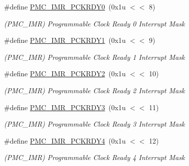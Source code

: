 \begin{DoxyCompactItemize}
\mbox{\label{group__SAME70__PMC_ga31f003d970a773e7eb1649c26aed0a68}} 
\#define \mbox{\hyperlink{group__SAME70__PMC_ga31f003d970a773e7eb1649c26aed0a68}{P\+M\+C\+\_\+\+I\+M\+R\+\_\+\+P\+C\+K\+R\+D\+Y0}}~(0x1u $<$$<$ 8)
\begin{DoxyCompactList}\small\item\em (P\+M\+C\+\_\+\+I\+MR) Programmable Clock Ready 0 Interrupt Mask \end{DoxyCompactList}\item 
\mbox{\label{group__SAME70__PMC_gac34959a795514620271d158871cf835d}} 
\#define \mbox{\hyperlink{group__SAME70__PMC_gac34959a795514620271d158871cf835d}{P\+M\+C\+\_\+\+I\+M\+R\+\_\+\+P\+C\+K\+R\+D\+Y1}}~(0x1u $<$$<$ 9)
\begin{DoxyCompactList}\small\item\em (P\+M\+C\+\_\+\+I\+MR) Programmable Clock Ready 1 Interrupt Mask \end{DoxyCompactList}\item 
\mbox{\label{group__SAME70__PMC_ga900f4f1c6b07e3713ce4a4935eea5fee}} 
\#define \mbox{\hyperlink{group__SAME70__PMC_ga900f4f1c6b07e3713ce4a4935eea5fee}{P\+M\+C\+\_\+\+I\+M\+R\+\_\+\+P\+C\+K\+R\+D\+Y2}}~(0x1u $<$$<$ 10)
\begin{DoxyCompactList}\small\item\em (P\+M\+C\+\_\+\+I\+MR) Programmable Clock Ready 2 Interrupt Mask \end{DoxyCompactList}\item 
\mbox{\label{group__SAME70__PMC_gaaeeb62343adc85408c5d94b90934b297}} 
\#define \mbox{\hyperlink{group__SAME70__PMC_gaaeeb62343adc85408c5d94b90934b297}{P\+M\+C\+\_\+\+I\+M\+R\+\_\+\+P\+C\+K\+R\+D\+Y3}}~(0x1u $<$$<$ 11)
\begin{DoxyCompactList}\small\item\em (P\+M\+C\+\_\+\+I\+MR) Programmable Clock Ready 3 Interrupt Mask \end{DoxyCompactList}\item 
\mbox{\label{group__SAME70__PMC_ga0223426b2d009e27a00a9da99dfa5670}} 
\#define \mbox{\hyperlink{group__SAME70__PMC_ga0223426b2d009e27a00a9da99dfa5670}{P\+M\+C\+\_\+\+I\+M\+R\+\_\+\+P\+C\+K\+R\+D\+Y4}}~(0x1u $<$$<$ 12)
\begin{DoxyCompactList}\small\item\em (P\+M\+C\+\_\+\+I\+MR) Programmable Clock Ready 4 Interrupt Mask \end{DoxyCompactList}\item 
$$
\end{DoxyCompactItemize}
